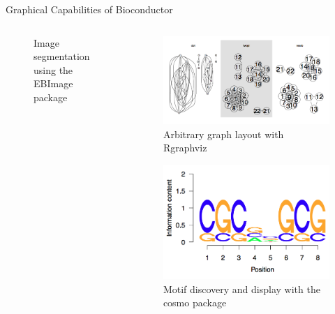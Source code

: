 \documentclass[final]{beamer}
\begin{document}
\begin{frame}[t]
\begin{columns}[t]
\begin{column}{0.48\linewidth}
\begin{block}{Graphical Capabilities of Bioconductor}
\begin{columns}[t]
\begin{column}{0.33\linewidth}
\begin{figure}
              \caption{Image segmentation using the EBImage package}
            \end{figure}
          \end{column}
          \begin{column}{0.33\linewidth}
            \begin{figure}
              \centering
              \includegraphics[width=0.85\linewidth]{rgraphviz}
              \caption{Arbitrary graph layout with Rgraphviz}
            \end{figure}
            \begin{figure}
              \centering
              \includegraphics[width=0.85\linewidth]{cosmo}
              \caption{Motif discovery and display with the cosmo package}
            \end{figure}
            \begin{figure}
              \centering

\end{figure}
\end{column}
\end{columns}
\end{block}
\end{column}
\end{columns}
\end{frame}
\end{document}
